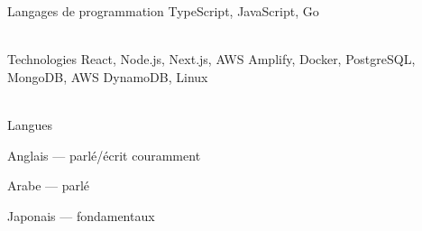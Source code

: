 

\begin{cvskills}

  \cvskill
  {Langages de programmation} %
  {TypeScript, JavaScript, Go} %

  \\

  \cvskill
  {Technologies} %
  {React, Node.js, Next.js, AWS Amplify, Docker, PostgreSQL, MongoDB, AWS DynamoDB, Linux}  %

  \\

  \cvskill
    {Langues} %
    {
      \begin{cvitems} %
        \item {Anglais — parlé/écrit couramment}
        \item {Arabe — parlé}
        \item {Japonais — fondamentaux}
      \end{cvitems}
    }

\end{cvskills}
